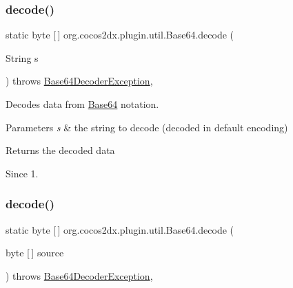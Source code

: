 \subsubsection{\texorpdfstring{decode()}{decode()}\hspace{0.1cm}{\footnotesize\ttfamily [1/4]}}
{\footnotesize\ttfamily static byte \mbox{[}$\,$\mbox{]} org.\+cocos2dx.\+plugin.\+util.\+Base64.\+decode (\begin{DoxyParamCaption}\item[{String}]{s }\end{DoxyParamCaption}) throws \hyperlink{classorg_1_1cocos2dx_1_1plugin_1_1util_1_1Base64DecoderException}{Base64\+Decoder\+Exception}\hspace{0.3cm}{\ttfamily [inline]}, {\ttfamily [static]}}

Decodes data from \hyperlink{classorg_1_1cocos2dx_1_1plugin_1_1util_1_1Base64}{Base64} notation.


\begin{DoxyParams}{Parameters}
{\em s} & the string to decode (decoded in default encoding) \\
\hline
\end{DoxyParams}
\begin{DoxyReturn}{Returns}
the decoded data 
\end{DoxyReturn}
\begin{DoxySince}{Since}
1. 
\end{DoxySince}
\mbox{\label{classorg_1_1cocos2dx_1_1plugin_1_1util_1_1Base64_afc764d12c8b0ecf6cfcd9a7b34c44e29}} 
\subsubsection{\texorpdfstring{decode()}{decode()}\hspace{0.1cm}{\footnotesize\ttfamily [2/4]}}
{\footnotesize\ttfamily static byte \mbox{[}$\,$\mbox{]} org.\+cocos2dx.\+plugin.\+util.\+Base64.\+decode (\begin{DoxyParamCaption}\item[{byte \mbox{[}$\,$\mbox{]}}]{source }\end{DoxyParamCaption}) throws \hyperlink{classorg_1_1cocos2dx_1_1plugin_1_1util_1_1Base64DecoderException}{Base64\+Decoder\+Exception}\hspace{0.3cm}{\ttfamily [inline]}, {\ttfamily [static]}}

